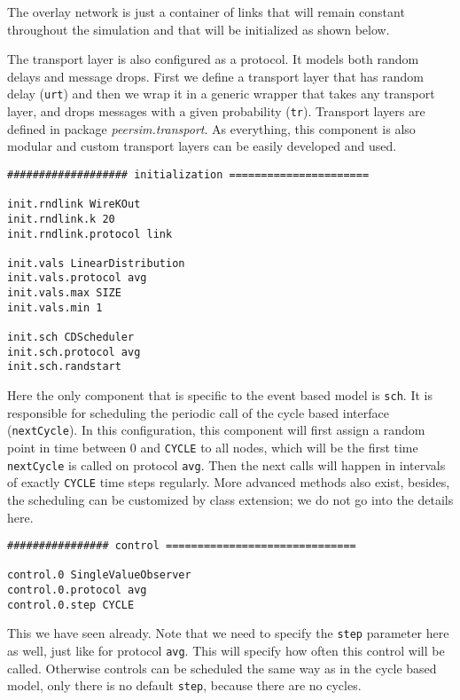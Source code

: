 \documentclass[a4paper,11pt]{article}
\begin{document}
The overlay network is just a container of links that will remain constant
throughout the simulation and that will be initialized as shown below.

The transport layer is also configured as a protocol. It models both random
delays and message drops.
First we define a transport layer that has random delay (\texttt{urt}) and
then we wrap it in a generic wrapper that takes any transport layer, and
drops messages with a given probability (\texttt{tr}).
Transport layers are defined in package \emph{peersim.transport}.
As everything, this component is also modular and custom transport layers can
be easily developed and used.

\footnotesize
\begin{verbatim}
################### initialization ======================

init.rndlink WireKOut
init.rndlink.k 20
init.rndlink.protocol link

init.vals LinearDistribution
init.vals.protocol avg
init.vals.max SIZE
init.vals.min 1

init.sch CDScheduler
init.sch.protocol avg
init.sch.randstart
\end{verbatim}
\normalsize

Here the only component that is specific to the event based model is
\texttt{sch}.
It is responsible for scheduling the periodic call of the cycle based
interface (\texttt{nextCycle}).
In this configuration, this component will first assign a random point in
time between 0 and \texttt{CYCLE} to all nodes, which will be the first
time \texttt{nextCycle} is called on protocol \texttt{avg}.
Then the next calls will happen in intervals of exactly \texttt{CYCLE} time
steps regularly.
More advanced methods also exist, besides, the scheduling can be customized
by class extension; we do not go into the details here.

\footnotesize
\begin{verbatim}
################ control ==============================

control.0 SingleValueObserver
control.0.protocol avg
control.0.step CYCLE
\end{verbatim}
\normalsize

This we have seen already.
Note that we need to specify the \texttt{step} parameter here as well,
just like for protocol \texttt{avg}.
This will specify how often this control will be called.
Otherwise controls can be scheduled the same way as in the cycle based model,
only there is no default \texttt{step}, because there are no cycles.
\end{document}
